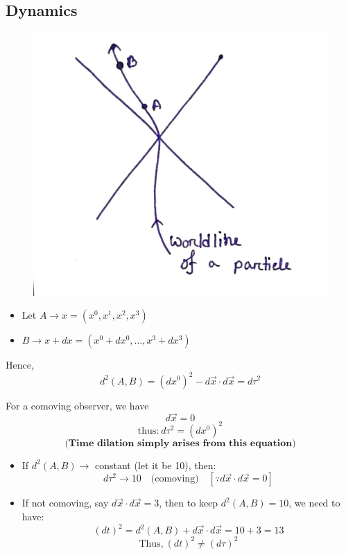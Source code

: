 \documentclass[14pt]{article} %
\begin{document}
\subsection*{Dynamics}
\begin{figure}[H]
\centering
\includegraphics[width=0.5\linewidth]{L(-1)_5.jpg}
\caption*{}
\end{figure}
\vspace{-1cm}
\begin{itemize}
    \item Let $A \to x = (x^0, x^1, x^2, x^3)$
    \item $B \to x + dx = (x^0 + dx^0, \ldots, x^3 + dx^3)$
\end{itemize}
Hence,
\[
d^2(A,B) = (dx^0)^2 - d\vec{x} \cdot d\vec{x} = d\tau^2
\]

For a comoving observer, we have $$d\vec{x} = 0$$
\[
\text{thus:}~ d\tau^2 = (dx^0)^2
\]
\[
\textbf{(Time dilation simply arises from this equation)}
\]
\begin{itemize}
    \item If $d^2(A,B) \to$ constant (let it be 10), then:
    $$d\tau^2 \to 10 \quad \text{(comoving)} \quad [\because d\vec{x} \cdot d\vec{x} = 0] $$
    
    \item If not comoving, say $d\vec{x} \cdot d\vec{x} = 3$, then to keep $d^2(A,B) = 10$, we need to have:
     $$(dt)^2 = d^2(A,B) + d\vec{x} \cdot d\vec{x} = 10 + 3 = 13$$ 
    $$\text{Thus,}~ \boxed{(dt)^2 \neq (d\tau)^2 }$$
\end{itemize}
\end{document}
